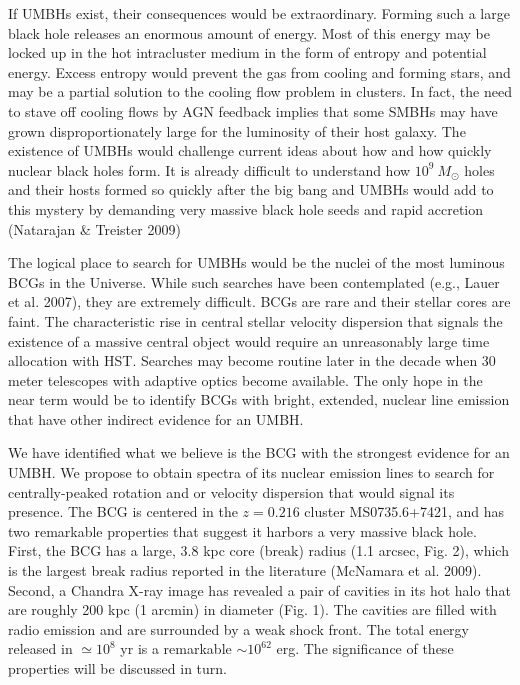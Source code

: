 \documentclass[12pt]{article}
\begin{document}
If UMBHs exist, their consequences would be extraordinary.   Forming such a large black hole releases an enormous amount of energy.  Most of this energy may be locked up in the
hot intracluster medium in the form of entropy and potential energy.  Excess entropy would
prevent the gas from cooling and forming stars, and may be a partial solution
to the cooling flow problem in clusters.  In fact, the need to stave off cooling flows by AGN feedback implies that some
SMBHs may have grown disproportionately large for the luminosity of their host galaxy.  The existence of
UMBHs would challenge current ideas about how and how quickly nuclear black holes form.   It is already difficult to understand how $10^9~M_\odot$ holes and their hosts formed so quickly after the big bang and UMBHs would
add to this mystery by demanding very massive black hole seeds and rapid accretion (Natarajan \& Treister 2009)


The logical place to search for UMBHs would be the nuclei of the most luminous BCGs in the Universe.  While such searches have been contemplated (e.g., Lauer et al. 2007), they are extremely difficult. BCGs are rare  and their stellar cores are faint.  The characteristic rise in central stellar velocity dispersion that signals the existence of
a massive central object would require an unreasonably large time allocation with HST.  Searches may become routine later in the decade when 30 meter telescopes with adaptive optics become available.  The only hope in the near term would be to identify BCGs with bright, extended, nuclear line emission that have other indirect evidence for an UMBH.  

We have identified what we believe is the BCG with the strongest evidence for an UMBH.   We propose to obtain spectra of its nuclear emission lines to search for centrally-peaked rotation and or velocity dispersion that would
signal its presence.  The BCG is centered in the $z=0.216$ cluster MS0735.6+7421, and has two remarkable properties that suggest it harbors a very massive black hole. First, the BCG has a large, $3.8$ kpc core (break) radius (1.1 arcsec, Fig. 2), which is the largest  break radius reported in the literature (McNamara et al. 2009).  Second, a Chandra X-ray image has revealed a pair of cavities in its hot halo that are roughly 200 kpc (1 arcmin) in diameter (Fig. 1).  The cavities are filled with radio emission and are surrounded by a weak shock front.  The total energy released in $\simeq 10^8$ yr is a remarkable $\sim 10^{62}$ erg.   
The significance of these properties will be discussed in turn. 
\end{document}
